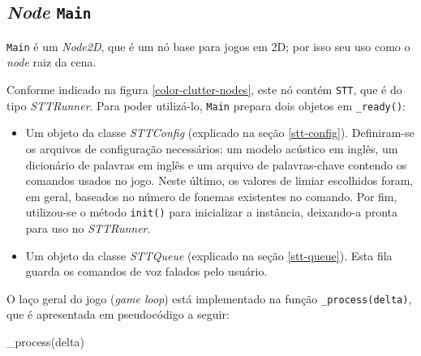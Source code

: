 
\subsection{\textit{Node} \texttt{Main}}

\texttt{Main} é um \textit{Node2D}, que é um nó base para jogos em 2D; por isso seu uso como o \textit{node} raiz da cena.

Conforme indicado na figura \ref{color-clutter-nodes}, este nó contém \texttt{STT}, que é do tipo \textit{STTRunner}. Para poder utilizá-lo, \texttt{Main} prepara dois objetos em \texttt{\_ready()}:

\begin{itemize}
\item Um objeto da classe \textit{STTConfig} (explicado na seção \ref{stt-config}). Definiram-se os arquivos de configuração necessários: um modelo acústico em inglês, um dicionário de palavras em inglês e um arquivo de palavras-chave contendo os comandos usados no jogo. Neste último, os valores de limiar escolhidos foram, em geral, baseados no número de fonemas existentes no comando. Por fim, utilizou-se o método \texttt{init()} para inicializar a instância, deixando-a pronta para uso no \textit{STTRunner}.

\item Um objeto da classe \textit{STTQueue} (explicado na seção \ref{stt-queue}). Esta fila guarda os comandos de voz falados pelo usuário.
\end{itemize}

O laço geral do jogo (\textit{game loop}) está implementado na função \texttt{\_process(delta)}, que é apresentada em pseudocódigo a seguir:

\begin{algorithm}
\begin{algorithmic}[1]
\Function{}{} {\_process}(delta)
\EndIf
\State
{}
    \EndIf
{}
    \EndIf
\EndIf
\State
{}
\EndIf
\EndFunction
\end{algorithmic}
\end{algorithm}

